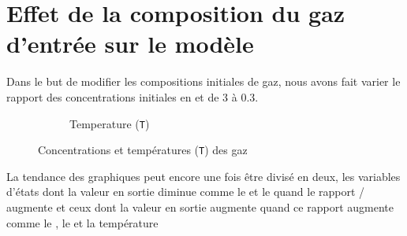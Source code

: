 \documentclass[11pt]{report}
\begin{document}
        \section{Effet de la composition du gaz d'entrée sur le modèle}
            Dans le but de modifier les compositions initiales de gaz,
            nous avons fait varier le rapport des concentrations initiales en  et  de 3 à 0.3.
            \begin{figure}[ht]
                \centering
                \begin{subfigure}[t]{0.325\textwidth}
                    \centering
                    
                    \caption{}
                    \label{graph:con:C0:CH4}
                \end{subfigure}
                \hfill
                \begin{subfigure}[t]{0.325\textwidth}
                    \centering
                    
                    \caption{}
                    \label{graph:con:C0:H2}
                \end{subfigure}
                \hfill
                \begin{subfigure}[t]{0.325\textwidth}
                    \centering
                    
                    \caption{}
                    \label{graph:con:C0:CO}
                \end{subfigure}
                \hfill
                \begin{subfigure}[t]{0.325\textwidth}
                    \centering
                    
                    \caption{}
                    \label{graph:con:C0:CO2}
                \end{subfigure}
                \begin{subfigure}[t]{0.325\textwidth}
                    \centering
                    
                    \caption{Temperature (\texttt{T})}
                    \label{graph:con:C0:T}
                \end{subfigure}
                \caption{Concentrations et températures (\texttt{T}) des gaz}
                \label{graph:con:C0}
            \end{figure}
            \par
            La tendance des graphiques peut encore une fois être divisé en deux, les variables d'états
            dont la valeur en sortie diminue comme le  et le  quand le rapport /
            augmente et ceux dont la valeur en sortie augmente quand ce rapport augmente comme le ,
            le  et la température
\end{document}

